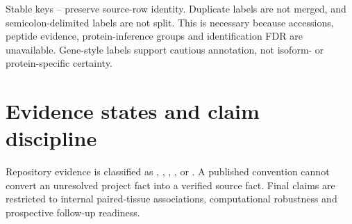 Stable keys \texttt{}–\texttt{} preserve source-row identity. Duplicate labels are not merged, and semicolon-delimited labels are not split. This is necessary because accessions, peptide evidence, protein-inference groups and identification FDR are unavailable. Gene-style labels support cautious annotation, not isoform- or protein-specific certainty.

\section{Evidence states and claim discipline}
\label{sec:evidence_states_and_claim_discipline}

Repository evidence is classified as , , , \texttt{}, or . A published convention cannot convert an unresolved project fact into a verified source fact. Final claims are restricted to internal paired-tissue associations, computational robustness and prospective follow-up readiness.
